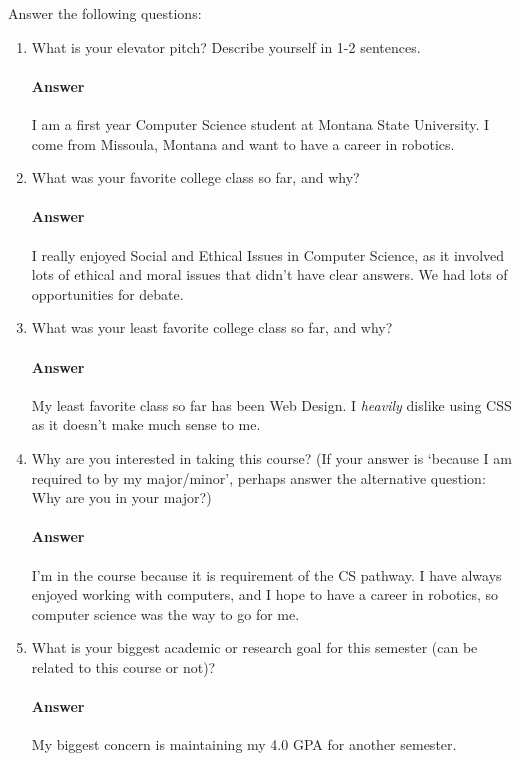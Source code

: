 \documentclass{article}
\begin{document}
Answer the following questions:
\begin{enumerate}
    \item What is your elevator pitch?  Describe yourself in 1-2
        sentences. 
	\paragraph{Answer} I am a first year Computer Science student at Montana State University. I come from Missoula, Montana and want to have a career in robotics.

    \item What was your favorite college class so far, and why?
        \paragraph{Answer} I really enjoyed Social and Ethical Issues in Computer Science, as it involved lots of ethical and moral issues that didn't have clear answers. We had lots of opportunities for debate.

    \item What was your least favorite college class so far, and why?
        \paragraph{Answer} My least favorite class so far has been Web Design. I \textit{heavily} dislike using CSS as it doesn't make much sense to me. 

    \item Why are you interested in taking this course? (If your answer is
        `because I am required to by my major/minor', perhaps answer the
        alternative question: Why are you in your major?)
	\paragraph{Answer} I'm in the course because it is requirement of the CS pathway. I have always enjoyed working with computers, and I hope to have a career in robotics, so computer science was the way to go for me. 

    \item What is your biggest academic or research goal for this semester (can
        be related to this course or not)?
        \paragraph{Answer} My biggest concern is maintaining my 4.0 GPA for another semester.


\end{enumerate}
\end{document}

